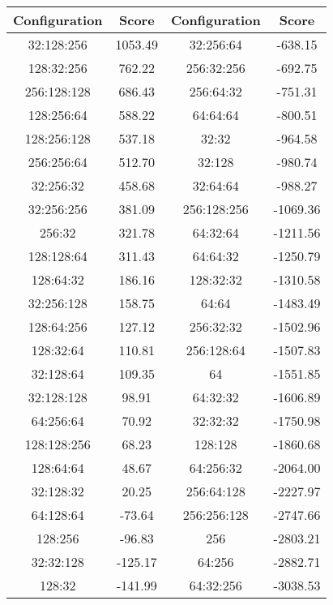 \begin{table}[h]
    \centering
    \begin{tabular}{|c|c||c|c|}
    \hline
    Configuration & Score & Configuration & Score \\
    \hline
    32:128:256 & 1053.49 & 32:256:64 & -638.15 \\
    \hline
    128:32:256 & 762.22 & 256:32:256 & -692.75 \\
    \hline
    256:128:128 & 686.43 & 256:64:32 & -751.31 \\
    \hline
    128:256:64 & 588.22 & 64:64:64 & -800.51 \\
    \hline
    128:256:128 & 537.18 & 32:32 & -964.58 \\
    \hline
    256:256:64 & 512.70 & 32:128 & -980.74 \\
    \hline
    32:256:32 & 458.68 & 32:64:64 & -988.27 \\
    \hline
    32:256:256 & 381.09 & 256:128:256 & -1069.36 \\
    \hline
    256:32 & 321.78 & 64:32:64 & -1211.56 \\
    \hline
    128:128:64 & 311.43 & 64:64:32 & -1250.79 \\
    \hline
    128:64:32 & 186.16 & 128:32:32 & -1310.58 \\
    \hline
    32:256:128 & 158.75 & 64:64 & -1483.49 \\
    \hline
    128:64:256 & 127.12 & 256:32:32 & -1502.96 \\
    \hline
    128:32:64 & 110.81 & 256:128:64 & -1507.83 \\
    \hline
    32:128:64 & 109.35 & 64 & -1551.85 \\
    \hline
    32:128:128 & 98.91 & 64:32:32 & -1606.89 \\
    \hline
    64:256:64 & 70.92 & 32:32:32 & -1750.98 \\
    \hline
    128:128:256 & 68.23 & 128:128 & -1860.68 \\
    \hline
    128:64:64 & 48.67 & 64:256:32 & -2064.00 \\
    \hline
    32:128:32 & 20.25 & 256:64:128 & -2227.97 \\
    \hline
    64:128:64 & -73.64 & 256:256:128 & -2747.66 \\
    \hline
    128:256 & -96.83 & 256 & -2803.21 \\
    \hline
    32:32:128 & -125.17 & 64:256 & -2882.71 \\
    \hline
    128:32 & -141.99 & 64:32:256 & -3038.53 \\

\end{tabular}
\end{table}
